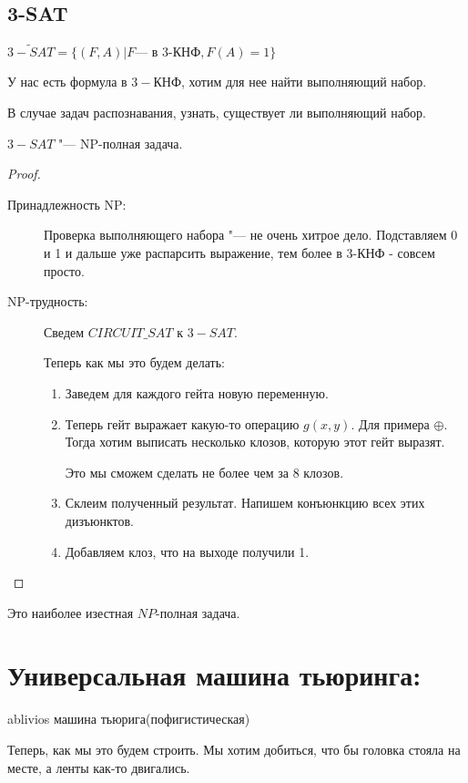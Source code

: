 \subsection{3-SAT}
\begin{Def}
	$\tilde{3-SAT} = \{(F, A)|F \text{--- в 3-КНФ}, F(A) = 1\}$
	
	У нас есть формула в $3-$КНФ, хотим для нее найти выполняющий набор.

	В случае задач распознавания, узнать, существует ли выполняющий набор. 
\end{Def} 
\begin{theorem}
	$3-SAT$ "--- NP-полная задача.
\end{theorem}
\begin{proof}
	\begin{description}
	\item[Принадлежность NP:]
		Проверка выполняющего набора "--- не очень хитрое дело. Подставляем 0 и 1 и 
		дальше уже распарсить выражение, тем более в 3-КНФ - совсем просто. 
	\item[NP-трудность:]
		Сведем $CIRCUIT\_SAT$ к $3-SAT$. 
		
		Теперь как мы это будем делать:
		\begin{enumerate}
		\item Заведем для каждого гейта новую переменную.
		\item Теперь гейт выражает какую-то операцию $g(x, y)$. Для примера $\oplus$. 
		Тогда хотим выписать несколько клозов, которую этот гейт выразят. 

		Это мы сможем сделать не более чем за 8 клозов.
		\item 
		Склеим полученный результат. Напишем конъюнкцию всех этих дизъюнктов. 
		\item 
		Добавляем клоз, что на выходе получили 1. 
		\end{enumerate}
	\end{description}
\end{proof}
\begin{Rem}
	Это наиболее изестная $NP$-полная задача. 
\end{Rem}

\section{Универсальная машина тьюринга:}

ablivios машина тьюрига(пофигистическая)

Теперь, как мы это будем строить. 
Мы хотим добиться, что бы головка стояла на месте, а ленты как-то двигались. 

